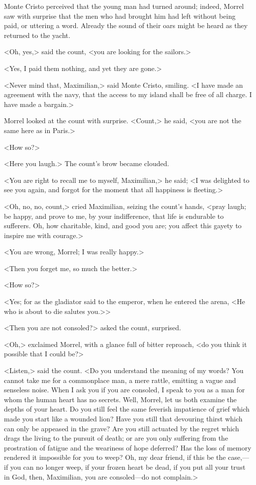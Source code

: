  Monte Cristo perceived that the young man had turned around; indeed, Morrel saw with surprise that the men who had brought him had left without being paid, or uttering a word. Already the sound of their oars might be heard as they returned to the yacht. 

 <Oh, yes,> said the count, <you are looking for the sailors.> 

 <Yes, I paid them nothing, and yet they are gone.> 

 <Never mind that, Maximilian,> said Monte Cristo, smiling. <I have made an agreement with the navy, that the access to my island shall be free of all charge. I have made a bargain.> 

 Morrel looked at the count with surprise. <Count,> he said, <you are not the same here as in Paris.> 

 <How so?> 

 <Here you laugh.> The count's brow became clouded. 

 <You are right to recall me to myself, Maximilian,> he said; <I was delighted to see you again, and forgot for the moment that all happiness is fleeting.> 

 <Oh, no, no, count,> cried Maximilian, seizing the count's hands, <pray laugh; be happy, and prove to me, by your indifference, that life is endurable to sufferers. Oh, how charitable, kind, and good you are; you affect this gayety to inspire me with courage.> 

 <You are wrong, Morrel; I was really happy.> 

 <Then you forget me, so much the better.> 

 <How so?> 

 <Yes; for as the gladiator said to the emperor, when he entered the arena, <He who is about to die salutes you.>> 

 <Then you are not consoled?> asked the count, surprised. 

 <Oh,> exclaimed Morrel, with a glance full of bitter reproach, <do you think it possible that I could be?> 

 <Listen,> said the count. <Do you understand the meaning of my words? You cannot take me for a commonplace man, a mere rattle, emitting a vague and senseless noise. When I ask you if you are consoled, I speak to you as a man for whom the human heart has no secrets. Well, Morrel, let us both examine the depths of your heart. Do you still feel the same feverish impatience of grief which made you start like a wounded lion? Have you still that devouring thirst which can only be appeased in the grave? Are you still actuated by the regret which drags the living to the pursuit of death; or are you only suffering from the prostration of fatigue and the weariness of hope deferred? Has the loss of memory rendered it impossible for you to weep? Oh, my dear friend, if this be the case,—if you can no longer weep, if your frozen heart be dead, if you put all your trust in God, then, Maximilian, you are consoled—do not complain.> 

